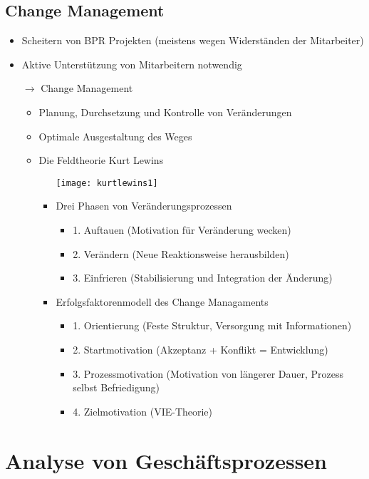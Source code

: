 \subsection{Change Management}
\begin{itemize}

\item Scheitern von BPR Projekten (meistens wegen Widerständen der Mitarbeiter)
\item Aktive Unterstützung von Mitarbeitern notwendig
\item[$\rightarrow$] Change Management
	\begin{itemize}
	\item Planung, Durchsetzung und Kontrolle von Veränderungen
	\item Optimale Ausgestaltung des Weges
	\item Die Feldtheorie Kurt Lewins
		\begin{itemize} \vspace{0.3cm}
		\item[] \texttt{[image: kurtlewins1]}
		\item Drei Phasen von Veränderungsprozessen
			\begin{itemize}
			\item 1. Auftauen (Motivation für Veränderung wecken)
			\item 2. Verändern (Neue Reaktionsweise herausbilden)
			\item 3. Einfrieren (Stabilisierung und Integration der Änderung)
			\end{itemize}
		\item Erfolgsfaktorenmodell des Change Managaments
			\begin{itemize}
			\item 1. Orientierung (Feste Struktur, Versorgung mit Informationen)
			\item 2. Startmotivation (Akzeptanz + Konflikt = Entwicklung)
			\item 3. Prozessmotivation (Motivation von längerer Dauer, Prozess selbst Befriedigung)
			\item 4. Zielmotivation (VIE-Theorie)
			\end{itemize}
		\end{itemize}
	\end{itemize}

\end{itemize}

\section{Analyse von Geschäftsprozessen}
